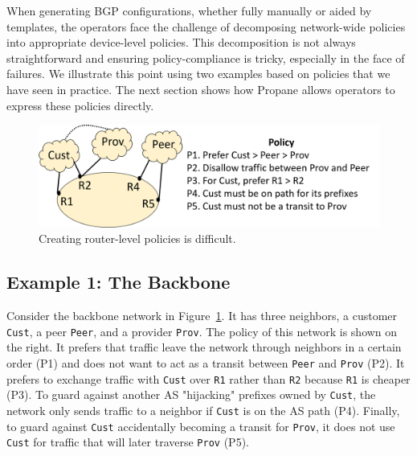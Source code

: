 \documentclass[10pt]{sigalternate052015}
\newcommand{\sysname}{{\small \sf Propane}\xspace}
\newcommand{\CD}[1]{\texttt{\small #1}}  %
\begin{document}
When generating BGP configurations, whether fully manually or aided by templates, the operators face the challenge of decomposing network-wide policies
into appropriate device-level policies.
This decomposition is not always straightforward and ensuring policy-compliance is tricky, especially in the face of failures. We illustrate this point using two examples based on policies that we have seen in practice. The next section shows how \sysname allows operators to express these policies directly. 

\begin{figure}[t!]
  \centering
  \includegraphics[width=\columnwidth]{figures/example1}
  \caption{Creating router-level policies is difficult.}
  \label{fig:example1}
  \vspace{-1em}
\end{figure}


\subsection{Example 1:  The Backbone}

Consider the backbone network in Figure~\ref{fig:example1}. It has
three neighbors, a customer \CD{Cust}, a peer \CD{Peer}, and a provider \CD{Prov}. The policy of this network is shown on the right. It prefers that traffic leave the network through neighbors in a certain order (P1) and does not want to act as a transit between \CD{Peer} and \CD{Prov} (P2). It prefers to exchange traffic with \CD{Cust} over \CD{R1} rather than \CD{R2} because \CD{R1} is cheaper (P3). To guard against another AS "hijacking" prefixes owned by \CD{Cust}, the network only sends traffic to a neighbor if \CD{Cust} is on the AS path (P4). Finally, to guard against \CD{Cust} accidentally becoming a transit for \CD{Prov}, it does not use \CD{Cust} for traffic that will later traverse \CD{Prov} (P5).
\end{document}
